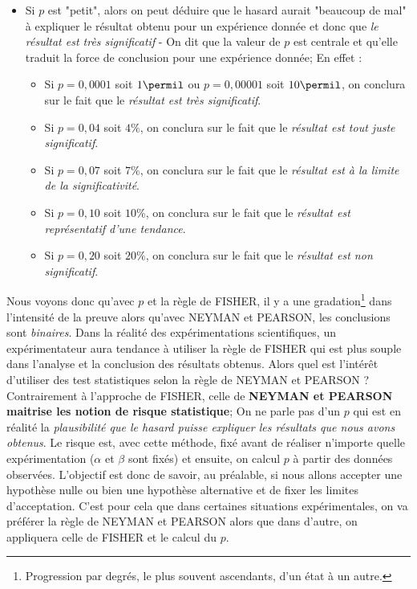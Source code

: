  \begin{itemize}
\item Si $p$ est "petit", alors on peut déduire que le hasard aurait "beaucoup de mal" à expliquer le résultat obtenu pour un expérience donnée et donc que \textit{le résultat est très significatif} - On dit que la valeur de $p$ est centrale et qu'elle traduit la force de conclusion pour une expérience donnée; En effet : 
\begin{itemize}
\item Si $p= 0,0001$ soit $1\permil$ ou $p= 0,00001$ soit $10\permil$, on conclura sur le fait que le \textit{résultat est très significatif}.
\item Si $p=0,04$ soit $4\%$, on conclura sur le fait que le \textit{résultat est tout juste significatif}.
\item Si $p=0,07$ soit $7\%$, on conclura sur le fait que le \textit{résultat est à la limite de la significativité}.
\item Si $p=0,10$ soit $10\%$, on conclura sur le fait que le \textit{résultat est représentatif d'une tendance}.
\item Si $p=0,20$ soit $20\%$, on conclura sur le fait que le \textit{résultat est non significatif}.
\end{itemize}
\end{itemize} 
Nous voyons donc qu'avec $p$ et la règle de FISHER, il y a une gradation\footnote{Progression par degrés, le plus souvent ascendants, d'un état à un autre.} dans l'intensité de la preuve alors qu'avec NEYMAN et PEARSON, les conclusions sont \textit{binaires}.\newline
Dans la réalité des expérimentations scientifiques, un expérimentateur aura tendance à utiliser la règle de FISHER qui est plus souple dans l'analyse et la conclusion des résultats obtenus.\newline
Alors quel est l'intérêt d'utiliser des test statistiques selon la règle de NEYMAN et PEARSON ?\newline
Contrairement à l'approche de FISHER, celle de \textbf{NEYMAN et PEARSON maitrise les notion de risque statistique}; On ne parle pas d'un $p$ qui est en réalité la \textit{plausibilité que le hasard puisse expliquer les résultats que nous avons obtenus}. Le risque est, avec cette méthode, fixé avant de réaliser n'importe quelle expérimentation ($\alpha$ et $\beta$ sont fixés) et ensuite, on calcul $p$ à partir des données observées. L'objectif est donc de savoir, au préalable, si nous allons accepter une hypothèse nulle ou bien une hypothèse alternative et de fixer les limites d'acceptation. C'est pour cela que dans certaines situations expérimentales, on va préférer la règle de NEYMAN et PEARSON alors que dans d'autre, on appliquera celle de FISHER et le calcul du $p$.\newline

